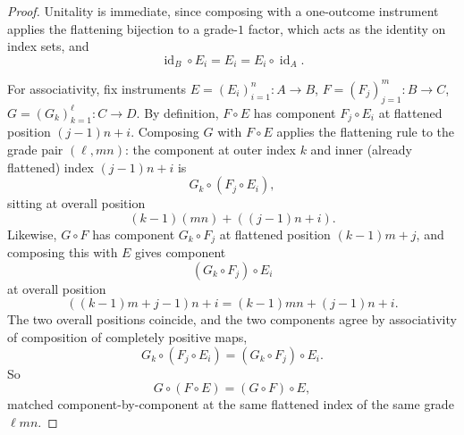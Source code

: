 \documentclass[11pt]{article}
\DeclareMathOperator{\id}{id}
\begin{document}
\begin{proof}
Unitality is immediate, since composing with a one-outcome instrument applies
the flattening bijection to a grade-$1$ factor, which acts as the identity on
index sets, and
\[
\id_B\circ E_i=E_i=E_i\circ\id_A.
\]

For associativity, fix instruments
$E=(E_i)_{i=1}^n:A\to B$, $F=(F_j)_{j=1}^m:B\to C$,
$G=(G_k)_{k=1}^\ell:C\to D$. By definition, $F\circ E$ has component
$F_j\circ E_i$ at flattened position $(j-1)n+i$. Composing $G$ with
$F\circ E$ applies the flattening rule to the grade pair $(\ell,mn)$: the
component at outer index $k$ and inner (already flattened) index
$(j-1)n+i$ is
\[
G_k\circ(F_j\circ E_i),
\]
sitting at overall position
\[
(k-1)(mn)+((j-1)n+i).
\]
Likewise, $G\circ F$ has component $G_k\circ F_j$ at flattened position
$(k-1)m+j$, and composing this with $E$ gives component
\[
(G_k\circ F_j)\circ E_i
\]
at overall position
\[
((k-1)m+j-1)n+i=(k-1)mn+(j-1)n+i.
\]
The two overall positions coincide, and the two components agree by
associativity of composition of completely positive maps,
\[
G_k\circ(F_j\circ E_i)=(G_k\circ F_j)\circ E_i.
\]
So
\[
G\circ(F\circ E)=(G\circ F)\circ E,
\]
matched component-by-component at the same flattened index of the same grade
$\ell mn$.
\end{proof}
\end{document}
